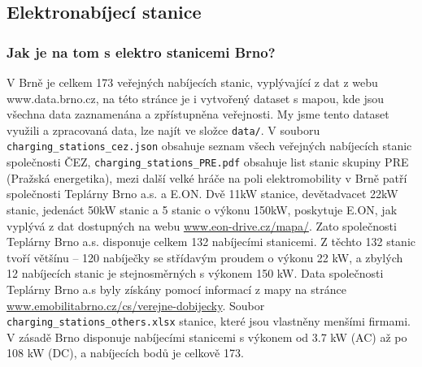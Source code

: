 \documentclass[a4paper,11pt]{article}
\begin{document}
\subsection{Elektronabíjecí stanice}

\subsubsection{Jak je na tom s elektro stanicemi Brno?}
\label{sec:stanice}
V Brně je celkem 173 veřejných nabíjecích stanic, vyplývající z dat z webu www.data.brno.cz\cite{data_brno},
na této stránce je i vytvořený dataset s mapou, kde jsou všechna data zaznamenána a zpřístupněna veřejnosti.
My jsme tento dataset využili a zpracovaná data, lze najít ve složce \texttt{data/}. V souboru \texttt{charging\_stations\_cez.json}
obsahuje seznam všech veřejných nabíjecích stanic společnosti ČEZ, \texttt{charging\_stations\_PRE.pdf} obsahuje
list stanic skupiny PRE (Pražská energetika), mezi další velké hráče na poli elektromobility v Brně patří společnosti
Teplárny Brno a.s. a E.ON. Dvě 11kW stanice, devětadvacet 22kW stanic, jedenáct 50kW stanic a 5 stanic o výkonu 150kW, 
poskytuje E.ON, jak vyplývá z dat dostupných na webu \href{https://www.eon-drive.cz/mapa/}{www.eon-drive.cz/mapa/}.
Zato společnosti Teplárny Brno a.s. disponuje celkem 132 nabíjecími stanicemi. Z těchto 132 stanic tvoří většínu -- 120 
nabíječky se střídavým proudem o výkonu 22 kW, a zbylých 12 nabíjecích stanic je stejnosměrných s výkonem 150 kW. 
Data společnosti Teplárny Brno a.s byly získány pomocí informací z mapy na stránce 
\href{https://www.emobilitabrno.cz/cs/verejne-dobijecky}{www.emobilitabrno.cz/cs/verejne-dobijecky}.
Soubor \texttt{charging\_stations\_others.xlsx} stanice, které jsou vlastněny menšími firmami.
V zásadě Brno disponuje nabíjecími stanicemi s výkonem od 3.7 kW (AC) až po 108 kW (DC), a nabíjecích bodů je 
celkově 173. \cite{eon_data, emobilita_data}

\end{document}
